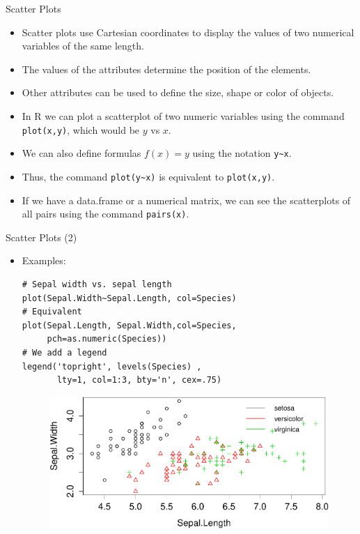 \documentclass[handout]{beamer}
\begin{document}
\begin{frame}[fragile]{Scatter Plots}
\scriptsize{
\begin{itemize}
 \item Scatter plots use Cartesian coordinates to display the values of two numerical variables of the same length.
 \item The values of the attributes determine the position of the elements.
 \item Other attributes can be used to define the size, shape or color of objects.
 
  \item In R we can plot a scatterplot of two numeric variables using the command \verb+plot(x,y)+, which would be $y$ vs $x$.
  
  \item We can also define formulas $f(x)=y$ using the notation \verb+y~x+.  
  
 \item Thus, the command \verb+plot(y~x)+ is equivalent to \verb+plot(x,y)+.
 
 \item If we have a data.frame or a numerical matrix, we can see the scatterplots of all pairs using the command \verb+pairs(x)+.
  
 
 
\end{itemize}




}
 
\end{frame}


\begin{frame}[fragile]{Scatter Plots (2)}
\scriptsize{
\begin{itemize}
 \item Examples:
 \begin{verbatim}
# Sepal width vs. sepal length 
plot(Sepal.Width~Sepal.Length, col=Species)
# Equivalent
plot(Sepal.Length, Sepal.Width,col=Species,
     pch=as.numeric(Species))
# We add a legend
legend('topright', levels(Species) , 
       lty=1, col=1:3, bty='n', cex=.75)  
 \end{verbatim}

  \begin{figure}[h!]
	\centering
	\includegraphics[scale=0.45]{pics/scatter1.pdf}		
\end{figure} 
 
 
\end{itemize}




}
 
\end{frame}
\end{document}
